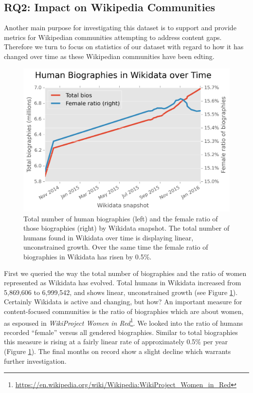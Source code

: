 \documentclass{sig-alternate-05-2015}
\begin{document}
\subsection{RQ2: Impact on Wikipedia Communities}
Another main purpose for investigating this dataset is to support and provide metrics for Wikipedian communities attempting to  address content gaps. Therefore we turn to focus on statistics of our dataset with regard to how it has changed over time as these Wiki\-pedian communities have been edting. 

\begin{figure}
\includegraphics[width=\columnwidth]{figures/totalfrb.png} 
\caption{Total number of human biographies (left) and the female ratio of those biographies (right) by Wikidata snapshot. The total number of humans found in Wikidata over time is displaying linear, unconstrained growth. Over the same time the female ratio of biographies in Wikidata has risen by 0.5\%.}
\label{fig:totalfrb}
\end{figure}

First we queried the way the total number of biographies and the ratio of women represented as Wikidata has evolved. Total humans in Wikidata increased from 5,869,606 to 6,999,542, and shows linear, unconstrained growth (see Figure \ref{fig:totalfrb}). Certainly Wikidata is active and changing, but how? An important measure for content-focused communities is the ratio of biographies which are about women, as espoused in \textit{WikiProject Women in Red}\footnote{\url{https://en.wikipedia.org/wiki/Wikipedia:WikiProject_Women_in_Red}}. We looked into the ratio of  humans recorded ``female'' versus all gendered biographies. Similar to total biographies this measure is rising at a fairly linear rate of approximately 0.5\% per year (Figure \ref{fig:totalfrb}). The final months on record show a slight decline which warrants further investigation. 
\end{document}
